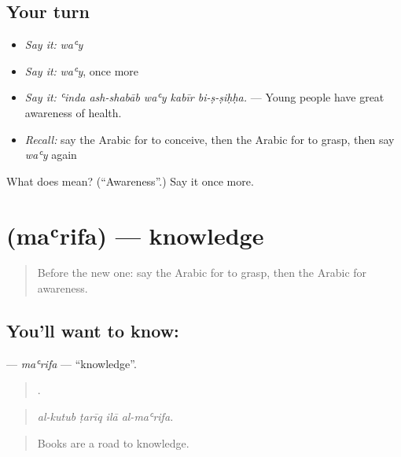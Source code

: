 \subsection*{Your turn}
\begin{itemize}
\raggedright
  \item \emph{Say it:} \emph{waʿy}
  \item \emph{Say it:} \emph{waʿy}, once more
  \item \emph{Say it:} \emph{ʿinda ash-shabāb waʿy kabīr bi-ṣ-ṣiḥḥa.} — Young people have great awareness of health.
  \item \emph{Recall:} say the Arabic for to conceive, then the Arabic for to grasp, then say \emph{waʿy} again
\end{itemize}

\begin{tcolorbox}[breakable,colback=teal!4,colframe=teal!35!black,title={Before you move on}]
What does  mean? (\textquotedblleft{}Awareness\textquotedblright{}.) Say it once more.
\end{tcolorbox}
\section[\texorpdfstring{\ar{معرفة} (maʿrifa)}{معرفة (maʿrifa)}]{ (maʿrifa) — knowledge}

\label{lesson:AR-C367-marifa}



\begin{quote}
Before the new one: say the Arabic for to grasp, then the Arabic for awareness.
\end{quote}

\subsection*{You'll want to know: }
\textbf{} — \emph{maʿrifa} — \textquotedblleft{}knowledge\textquotedblright{}.

\begin{quote}
   .
\end{quote}

\begin{quote}
\emph{al-kutub ṭarīq ilā al-maʿrifa.}
\end{quote}

\begin{quote}
Books are a road to knowledge.
\end{quote}

